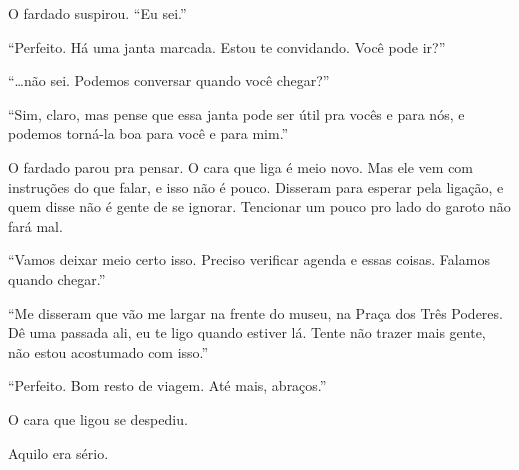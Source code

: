 O fardado suspirou. ``Eu sei.''

``Perfeito. Há uma janta marcada. Estou te convidando. Você pode ir?''

``\ldots não sei. Podemos conversar quando você chegar?''

``Sim, claro, mas pense que essa janta pode ser útil pra vocês e para nós, e podemos torná-la boa para você e para mim.''

O fardado parou pra pensar. O cara que liga é meio novo. Mas ele vem com instruções do que falar, e isso não é pouco. Disseram para esperar pela ligação, e quem disse não é gente de se ignorar. Tencionar um pouco pro lado do garoto não fará mal.

``Vamos deixar meio certo isso. Preciso verificar agenda e essas coisas. Falamos quando chegar.''

``Me disseram que vão me largar na frente do museu, na Praça dos Três Poderes. Dê uma passada ali, eu te ligo quando estiver lá. Tente não trazer mais gente, não estou acostumado com isso.''

``Perfeito. Bom resto de viagem. Até mais, abraços.''

O cara que ligou se despediu.

Aquilo era sério.
